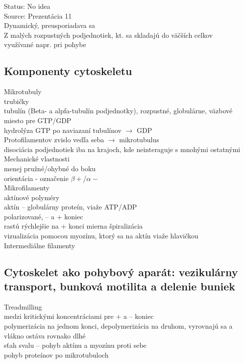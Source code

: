 Status: No idea\\
Source: Prezentácia 11\\

Dynamický, preusporiadava sa\\
Z malých rozpustných podjednotiek, kt. sa skladajú do väčších celkov\\
\tab využívané napr. pri pohybe\\
\subsection{Komponenty cytoskeletu}
Mikrotubuly\\
\tab trubičky\\
\tab tubulín (Beta- a alpfa-tubulín podjednotky), rozpustné, globulárne, väzbové miesto pre GTP/GDP\\
\tab hydrolýza GTP po naviazaní tubulínov $\rightarrow$ GDP\\
 Protofilamentov zvislo vedľa seba $\rightarrow$ mikrotubulus\\
\tab disociácia podjednotiek iba na krajoch, kde neinteraguje s mnohými ostatnými\\

Mechanické vlastnosti\\
\tab menej pružné/ohybné do boku\\
\tab orientácia - označenie $\beta+$/$\alpha-$\\

Mikrofilamenty\\
\tab aktínové polyméry\\
\tab aktín -- globulárny proteín, viaže ATP/ADP\\
\tab polarizované, -- a + koniec\\
\tab rastú rýchlejšie na + konci
\tab mierna špiralizácia\\
\tab vizualizácia pomocou myozínu, ktorý sa na aktín viaže hlavičkou\\

Intermediálne filamenty\\
\subsection{Cytoskelet ako pohybový aparát: vezikulárny transport, bunková motilita a delenie buniek}
Treadmilling\\
\tab medzi kritickými koncentráciami pre + a -- koniec\\
\tab polymerizácia na jednom konci, depolymerizácia na druhom, vyrovnajú sa a vlákno ostáva rovnako dlhé\\
sťah svalu -- pohyb aktínu a myozínu proti sebe\\
pohyb proteínov po mikrotubuloch\\

